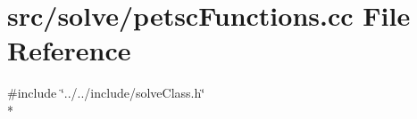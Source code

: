 \section{src/solve/petsc\-Functions.cc File Reference}
\label{petsc_functions_8cc}
{\ttfamily \#include \char`\"{}../../include/solve\-Class.\-h\char`\"{}}\\*
